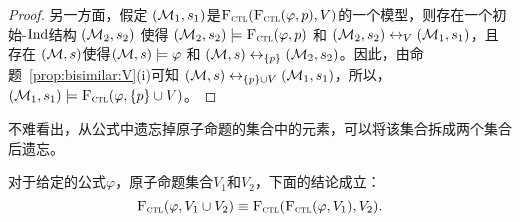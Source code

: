 \begin{proof}
另一方面，假定 $({\cal M}_1, s_1)$是${\textsc{F}_{\textsc{ctl}}}({\textsc{F}_{\textsc{ctl}}}(\varphi, p), V)$的一个模型，则存在一个初始-$\textrm{Ind}$结构 $({\cal M}_2, s_2)$ 使得 $({\cal M}_2, s_2) \models {\textsc{F}_{\textsc{ctl}}}(\varphi, p)$ 和 $({\cal M}_2, s_2) \leftrightarrow_V ({\cal M}_1, s_1)$，且存在 $({\cal M}, s)$使得$({\cal M}, s) \models \varphi$ 和 $({\cal M}, s) \leftrightarrow_{\{p\}} ({\cal M}_2, s_2)$。因此，由命题~\ref{prop:bisimilar:V}(i)可知 $({\cal M}, s) \leftrightarrow_{\{p\} \cup V} ({\cal M}_1, s_1)$，所以， $({\cal M}_1, s_1) \models {\textsc{F}_{\textsc{ctl}}}(\varphi, \{p\} \cup V)$。
\end{proof}

不难看出，从公式中遗忘掉原子命题的集合中的元素，可以将该集合拆成两个集合后遗忘。
\begin{corollary}
	对于给定的公式$\varphi$，原子命题集合$V_1$和$V_2$，下面的结论成立：
	\[
	{\textsc{F}_{\textsc{ctl}}}(\varphi,V_1\cup V_2) \equiv {\textsc{F}_{\textsc{ctl}}}({\textsc{F}_{\textsc{ctl}}}(\varphi,V_1),V_2).
	\]
\end{corollary}

